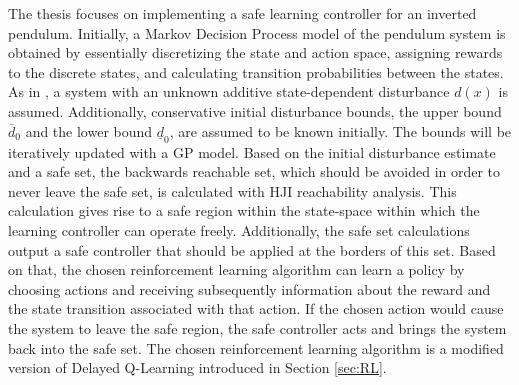 \documentclass[../main.tex]{subfiles}
\begin{document}
The thesis focuses on implementing a safe learning controller for an inverted pendulum. Initially, a Markov Decision Process model of the pendulum system is obtained by essentially discretizing the state and action space, assigning rewards to the discrete states, and calculating transition probabilities between the states. As in \cite{akametalu2014reachability}, a system with an unknown additive state-dependent disturbance $d(x)$ is assumed. Additionally, conservative initial disturbance bounds, the upper bound $\overline{d}_0$ and the lower bound $\underline{d}_0$, are assumed to be known initially. The bounds will be iteratively updated with a GP model. Based on the initial disturbance estimate and a safe set, the backwards reachable set, which should be avoided in order to never leave the safe set, is calculated with HJI reachability analysis. This calculation gives rise to a safe region within the state-space within which the learning controller can operate freely. Additionally, the safe set calculations output a safe controller that should be applied at the borders of this set. Based on that, the chosen reinforcement learning algorithm can learn a policy by choosing actions and receiving subsequently information about the reward and the state transition associated with that action. If the chosen action would cause the system to leave the safe region, the safe controller acts and brings the system back into the safe set. The chosen reinforcement learning algorithm is a modified version of Delayed Q-Learning introduced in Section \ref{sec:RL}.
\end{document}
